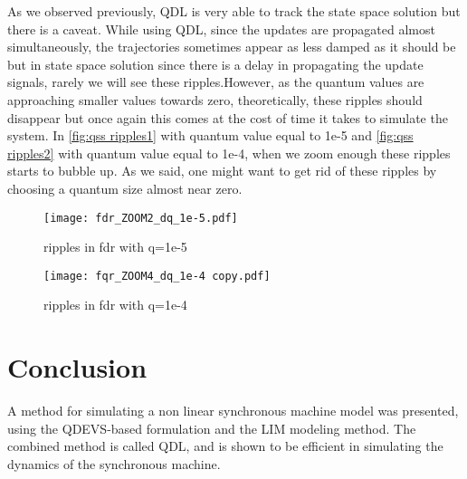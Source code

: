 \documentclass{article}
\theoremstyle{scsthe}
\begin{document}
As we observed previously, QDL is very able to track the state space solution but there is a caveat. While using QDL, since the updates are propagated almost simultaneously, the trajectories sometimes appear as less damped as it should be but in state space solution since there is a delay in propagating the update signals, rarely we will see these ripples.However, as the quantum values are approaching smaller values towards zero, theoretically, these ripples should disappear but once again this comes at the cost of time it takes to simulate the system. In \autoref{fig:qss ripples1}  with quantum value equal to 1e-5 and \autoref{fig:qss ripples2} with quantum value equal to 1e-4, when we zoom enough these ripples starts to bubble up. As we said, one might want to get rid of these ripples by choosing a quantum size almost near zero.
\begin{figure}[H]
  \FloatBarrier
    \centering
    \texttt{[image: fdr\_ZOOM2\_dq\_1e-5.pdf]}
    \caption{ripples in fdr with q=1e-5 }
    \label{fig:qss ripples1}
\end{figure}

\begin{figure}[H]
  \FloatBarrier
    \centering
    \texttt{[image: fqr\_ZOOM4\_dq\_1e-4 copy.pdf]}
    \caption{ripples in fdr with q=1e-4}
    \label{fig:qss ripples2}
\end{figure}



\section{Conclusion}

A method for simulating a non linear synchronous machine model was presented, using the QDEVS-based formulation and the LIM modeling method. The combined method is called QDL, and is shown to be efficient in simulating the dynamics of the synchronous machine.




\end{document}
